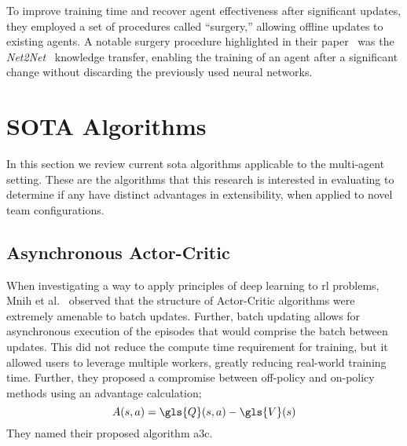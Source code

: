 To improve training time and recover agent effectiveness after 
significant updates, they employed a set of procedures called 
``surgery,'' allowing offline updates to existing agents. 
A notable surgery procedure highlighted in their paper~\cite{berner2019} 
was the \emph{Net2Net}~\cite{chen2016} knowledge transfer, 
enabling the training of an agent after a significant change 
without discarding the previously used neural networks.






\section{SOTA Algorithms} 

In this section we review current \gls{sota} algorithms
applicable to the multi-agent setting.
These are the algorithms that this research is interested 
in evaluating to determine if any have distinct advantages
in extensibility, when applied to novel team configurations.

%

    \subsection*{Asynchronous Actor-Critic}

When investigating a way to apply principles of deep learning to \gls{rl}
problems, Mnih et al.~\cite{mnih2016} observed that the structure of
Actor-Critic algorithms were extremely amenable to batch updates.
Further, batch updating allows for asynchronous execution of 
the episodes that would comprise the batch between updates.
This did not reduce the compute time requirement for training, 
but it allowed users to leverage multiple workers, 
greatly reducing real-world training time.
Further, they proposed a compromise between off-policy and on-policy
methods using an advantage calculation;
\begin{equation}
    A(s,a) = \gls{Q}(s,a) - \gls{V}(s)
\end{equation}
They named their proposed algorithm \gls{a3c}.

